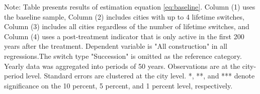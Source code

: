 \begin{table}[htbp]
\begin{tabular}{lcccc}
      
   \end{tabular}
   
   \par \raggedright 
   Note: Table presents results of estimation equation \eqref{eq:baseline}. Column (1) uses the baseline sample, Column (2) includes cities with up to 4 lifetime switches, Column (3) includes all cities regardless of the number of lifetime switches, and Column (4) uses a post-treatment indicator that is only active in the first 200 years after the treatment. Dependent variable is "All construction" in  all regressions.The switch type "Succession" is omitted as the reference category. Yearly data was aggregated into periods of 50 years. Observations are at the city-period level. Standard errors are  clustered at the city level. *, **, and *** denote significance on the 10 percent, 5 percent, and 1 percent  level, respectively.
\end{table}
